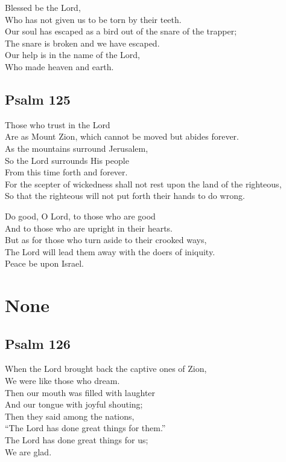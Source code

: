 \documentclass[14pt]{extbook}
\begin{document}
Blessed be the Lord,\\
Who has not given us to be torn by their teeth.\\
Our soul has escaped as a bird out of the snare of the trapper;\\
The snare is broken and we have escaped.\\
Our help is in the name of the Lord,\\
Who made heaven and earth.

\newpage
\hypertarget{psalm-125}{%
\subsection{Psalm 125}\label{psalm-125}}

Those who trust in the Lord\\
Are as Mount Zion, which cannot be moved but abides forever.\\
As the mountains surround Jerusalem,\\
So the Lord surrounds His people\\
From this time forth and forever.\\
For the scepter of wickedness shall not rest upon the land of the
righteous,\\
So that the righteous will not put forth their hands to do wrong.

Do good, O Lord, to those who are good\\
And to those who are upright in their hearts.\\
But as for those who turn aside to their crooked ways,\\
The Lord will lead them away with the doers of iniquity.\\
Peace be upon Israel.

\newpage
\hypertarget{none}{%
\section{None}\label{none}}

\hypertarget{psalm-126}{%
\subsection{Psalm 126}\label{psalm-126}}

When the Lord brought back the captive ones of Zion,\\
We were like those who dream.\\
Then our mouth was filled with laughter\\
And our tongue with joyful shouting;\\
Then they said among the nations,\\
``The Lord has done great things for them.''\\
The Lord has done great things for us;\\
We are glad.
\end{document}
